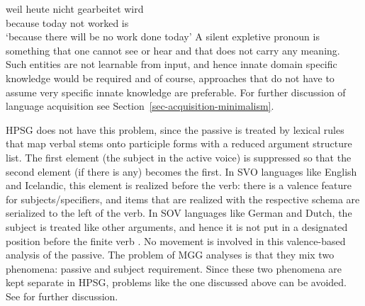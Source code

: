\documentclass[output=paper
	        ,collection
	        ,collectionchapter
 	        ,biblatex
                ,babelshorthands
                ,newtxmath
                ,draftmode
                ,colorlinks, citecolor=brown
]{langscibook}
\begin{document}
\ea
\gll weil heute nicht gearbeitet wird\\
     because today not worked is\\
\glt `because there will be no work done today'
\z
A silent expletive pronoun is something that one cannot see or hear and that does not carry any
meaning. Such entities are not learnable from input, and hence innate domain specific knowledge would
be required and of course, approaches that do not have to assume very specific innate knowledge are
preferable. For further discussion of language acquisition see Section~\ref{sec-acquisition-minimalism}.%

HPSG does not have this problem, since the passive is treated by lexical rules that map verbal stems onto
participle forms with a reduced argument structure list. The first element (the subject in the
active voice) is suppressed so that the second element (if there is any) becomes the first. In SVO languages
like English and Icelandic, this element is realized before the verb: there is a valence feature for
subjects/specifiers, and items that are realized with the respective schema are serialized to the
left of the verb. In SOV languages like German and Dutch, the subject is treated like other arguments,
and hence it is not put in a designated position before the finite verb . No movement is
involved in this valence-based analysis of the passive. The problem of MGG analyses is that they mix two phenomena: passive and subject
requirement. Since these two phenomena are kept separate in HPSG, problems like the one discussed
above can be avoided. See  for further discussion.

\end{document}
